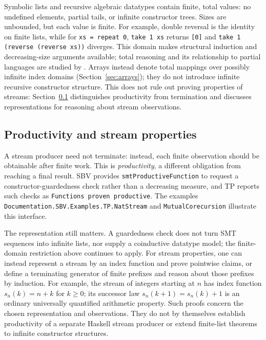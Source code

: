 \documentclass[review]{jfp-epi}
\newcommand{\code}[1]{\texttt{#1}}
\begin{document}
Symbolic lists and recursive algebraic datatypes contain finite, total values:
no undefined elements, partial tails, or infinite constructor trees. Sizes are
unbounded, but each value is finite. For example, double reversal is the identity
on finite lists, while for \code{xs = repeat 0}, \code{take 1 xs} returns
\code{[0]} and \code{take 1 (reverse (reverse xs))} diverges. This domain makes
structural induction and decreasing-size arguments available; total reasoning
and its relationship to partial languages are studied by
\citet{fastloose}. Arrays instead denote total mappings over possibly infinite
index domains (Section~\ref{sec:arrays}); they do not introduce infinite recursive
constructor structure. This does not rule out proving properties of streams:
Section~\ref{sec:productivity} distinguishes productivity from termination and
discusses representations for reasoning about stream observations.

\subsection{Productivity and stream properties}
\label{sec:productivity}

A stream producer need not terminate: instead, each finite observation should
be obtainable after finite work. This is \emph{productivity}, a different
obligation from reaching a final result. SBV provides
\code{smtProductiveFunction} to request a constructor-guardedness check rather
than a decreasing measure, and TP reports such checks as
\code{Functions proven productive}. The examples
\code{Documentation.\allowbreak SBV.\allowbreak Examples.\allowbreak TP.\allowbreak NatStream}
and \code{MutualCorecursion} illustrate this interface.

The representation still matters. A guardedness check does not turn SMT
sequences into infinite lists, nor supply a coinductive datatype model; the
finite-domain restriction above continues to apply. For stream properties,
one can instead represent a stream by an index function and prove pointwise
claims, or define a terminating generator of finite prefixes and reason about
those prefixes by induction. For example, the stream of integers starting at
$n$ has index function $s_n(k)=n+k$ for $k\geq0$; its successor law
$s_n(k+1)=s_n(k)+1$ is an ordinary universally quantified arithmetic property.
Such proofs concern the chosen representation and observations. They do not
by themselves establish productivity of a separate Haskell stream producer or
extend finite-list theorems to infinite constructor structures.
\end{document}
